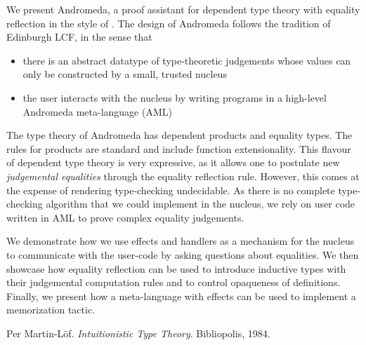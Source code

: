 \documentclass[a4paper,UKenglish]{dagrep}
\begin{document}
\license
{}

We present Andromeda, a proof assistant for dependent type theory with
equality reflection in the style of \cite{ML84}. The design of Andromeda follows the
tradition of Edinburgh LCF, in the sense that
\begin{itemize}
\item there is an abstract datatype of type-theoretic judgements whose values can
    only be constructed by a small, trusted nucleus
\item the user interacts with the nucleus by writing programs in a high-level Andromeda meta-language (AML)
\end{itemize}

The type theory of Andromeda has dependent products and equality types. The
rules for products are standard and include function extensionality. This
flavour of dependent type theory is very expressive, as it allows one to
postulate new \emph{judgemental equalities} through the equality reflection
rule. However, this comes at the expense of rendering type-checking
undecidable. As there is no complete type-checking algorithm that we could
implement in the nucleus, we rely on user code written in AML to prove complex
equality judgements.

We demonstrate how we use effects and handlers as a mechanism for the nucleus
to communicate with the user-code by asking questions about equalities. We then
showcase how equality reflection can be used to introduce inductive types with
their judgemental computation rules and to control opaqueness of definitions.
Finally, we present how a meta-language with effects can be used to implement a
memorization tactic.

\begin{thebibliography}{0}
 Per Martin-Löf. \emph{Intuitionistic Type Theory}. Bibliopolis, 1984.
\end{thebibliography}

\license
\end{document}
